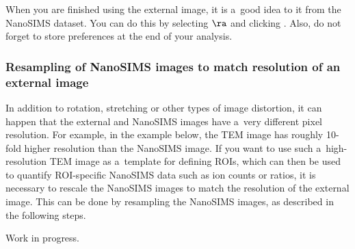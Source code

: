 \s When you are finished using the external image, it is a~good idea to  it from the NanoSIMS dataset. You can do this by selecting  $\ra$  and clicking . Also, do not forget to store preferences at the end of your analysis.


\subsubsection{Resampling of NanoSIMS images to match resolution of an external image}
\setcounter{step}{0}

\goldbox{}
In addition to rotation, stretching or other types of image distortion, it can happen that the external and NanoSIMS images have a~very different pixel resolution. For example, in the example below, the TEM image has roughly 10-fold higher resolution than the NanoSIMS image. If you want to use such a~high-resolution TEM image as a~template for defining ROIs, which can then be used to quantify ROI-specific NanoSIMS data such as ion counts or ratios, it is necessary to rescale the NanoSIMS images to match the resolution of the external image. This can be done by resampling the NanoSIMS images, as described in the following steps.
\tcbe

\nb Work in progress.


